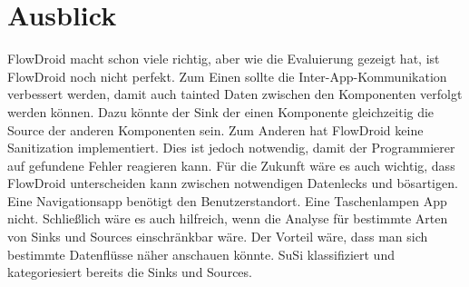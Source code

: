 \documentclass[runningheads]{llncs}
\begin{document}
\section{Ausblick}
FlowDroid macht schon viele richtig, aber wie die Evaluierung gezeigt hat, ist FlowDroid noch nicht perfekt. Zum Einen sollte die Inter-App-Kommunikation verbessert werden, damit auch tainted Daten zwischen den Komponenten verfolgt werden können. Dazu könnte der Sink der einen Komponente gleichzeitig die Source der anderen Komponenten sein.
Zum Anderen hat FlowDroid keine Sanitization implementiert. Dies ist jedoch notwendig, damit der Programmierer auf gefundene Fehler reagieren kann. 
Für die Zukunft wäre es auch wichtig, dass FlowDroid unterscheiden kann zwischen notwendigen Datenlecks und bösartigen. Eine Navigationsapp benötigt den Benutzerstandort. Eine Taschenlampen App nicht.
Schließlich wäre es auch hilfreich, wenn die Analyse für bestimmte Arten von Sinks und Sources einschränkbar wäre. Der Vorteil wäre, dass man sich bestimmte Datenflüsse näher anschauen könnte. SuSi klassifiziert und kategoriesiert bereits die Sinks und Sources.
%

\nocite{*}


\end{document}
